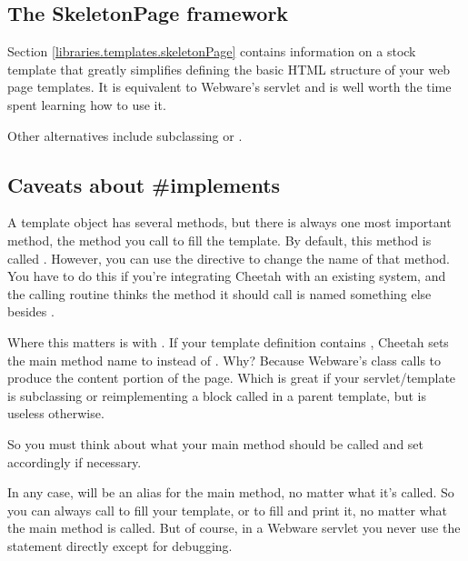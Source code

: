 \subsection{The SkeletonPage framework}
\label{webware.skeletonPage}

Section \ref{libraries.templates.skeletonPage} contains information on a stock
template that greatly simplifies defining the basic HTML structure of your web
page templates.  It is equivalent to Webware's  servlet and
is well worth the time spent learning how to use it.

Other alternatives include subclassing  or
.  


\subsection{Caveats about \#implements}
\label{webware.implements}

A template object has several methods, but there is always one most important
method, the method you call to fill the template.  By default, this method is
called .  However, you can use the 
directive to change the name of that method.  You have to do this if you're
integrating Cheetah with an existing system, and the calling routine thinks the
method it should call is named something else besides .

Where this matters is with .  If your template definition 
contains , Cheetah sets the main method name to 
 instead of .  Why?  Because Webware's
 class calls  to produce the content 
portion of the page.  Which is great if your servlet/template is subclassing
 or reimplementing a block called  in a
parent template, but is useless otherwise.

So you must think about what your main method should be called and set
 accordingly if necessary.


In any case,  will be an alias for the main method, no
matter what it's called.  So you can always call  to fill your
template, or  to fill and print it, no matter what the main
method is called.  But of course, in a Webware servlet you never use the
 statement directly except for debugging.

